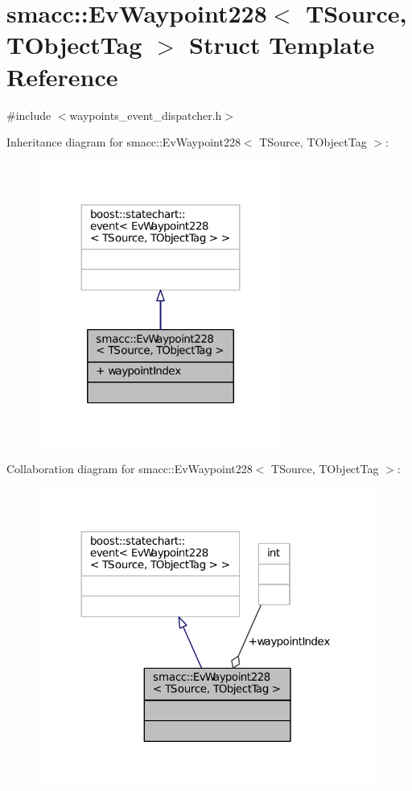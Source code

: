 \hypertarget{structsmacc_1_1EvWaypoint228}{}\section{smacc\+:\+:Ev\+Waypoint228$<$ T\+Source, T\+Object\+Tag $>$ Struct Template Reference}
\label{structsmacc_1_1EvWaypoint228}


{\ttfamily \#include $<$waypoints\+\_\+event\+\_\+dispatcher.\+h$>$}



Inheritance diagram for smacc\+:\+:Ev\+Waypoint228$<$ T\+Source, T\+Object\+Tag $>$\+:
\nopagebreak
\begin{figure}[H]
\begin{center}
\leavevmode
\includegraphics[width=227pt]{structsmacc_1_1EvWaypoint228__inherit__graph}
\end{center}
\end{figure}


Collaboration diagram for smacc\+:\+:Ev\+Waypoint228$<$ T\+Source, T\+Object\+Tag $>$\+:
\nopagebreak
\begin{figure}[H]
\begin{center}
\leavevmode
\includegraphics[width=312pt]{structsmacc_1_1EvWaypoint228__coll__graph}
\end{center}
\end{figure}
